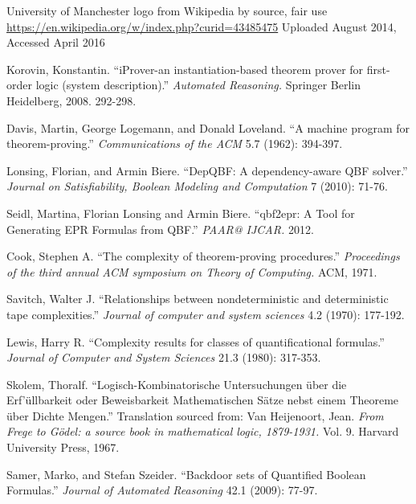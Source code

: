 \begin{thebibliography}{11}

University of Manchester logo from Wikipedia by source, fair use\newline
\url{https://en.wikipedia.org/w/index.php?curid=43485475}\newline
Uploaded  August 2014, Accessed  April 2016

Korovin, Konstantin. ``iProver-an instantiation-based theorem prover for first-order logic (system description).'' \textit{Automated Reasoning.} Springer Berlin Heidelberg, 2008. 292-298.

Davis, Martin, George Logemann, and Donald Loveland. ``A machine program for theorem-proving.'' \textit{Communications of the ACM} 5.7 (1962): 394-397.

Lonsing, Florian, and Armin Biere. ``DepQBF: A dependency-aware QBF solver.'' \textit{Journal on Satisfiability, Boolean Modeling and Computation} 7 (2010): 71-76.

Seidl, Martina, Florian Lonsing and Armin Biere. ``qbf2epr: A Tool for Generating EPR Formulas from QBF.'' \textit{PAAR@ IJCAR.} 2012.
  
Cook, Stephen A. ``The complexity of theorem-proving procedures.'' \textit{Proceedings of the third annual ACM symposium on Theory of Computing.} ACM, 1971.

Savitch, Walter J. ``Relationships between nondeterministic and deterministic tape complexities.'' \textit{Journal of computer and system sciences} 4.2 (1970): 177-192.

Lewis, Harry R. ``Complexity results for classes of quantificational formulas.'' \textit{Journal of Computer and System Sciences} 21.3 (1980): 317-353.

Skolem, Thoralf. ``Logisch-Kombinatorische Untersuchungen {\"u}ber die Erf'{\"u}llbarkeit oder Beweisbarkeit Mathematischen S{\"a}tze nebst einem Theoreme {\"u}ber Dichte Mengen.'' Translation sourced from: Van Heijenoort, Jean. \textit{From Frege to G{\"o}del: a source book in mathematical logic, 1879-1931.} Vol. 9. Harvard University Press, 1967.

Samer, Marko, and Stefan Szeider. ``Backdoor sets of Quantified Boolean Formulas.'' \textit{Journal of Automated Reasoning} 42.1 (2009): 77-97.


\end{thebibliography}
